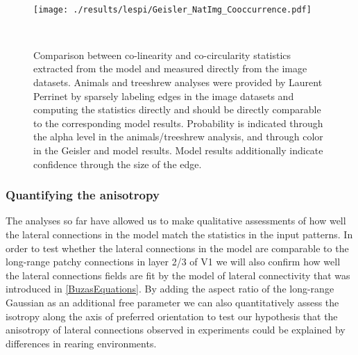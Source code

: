 \begin{figure}
  \begin{minipage}[t]{0.67\textwidth}
    \mbox{}\\[-\baselineskip]    \texttt{[image: ./results/lespi/Geisler\_NatImg\_Cooccurrence.pdf]}
  \end{minipage}\hfill
  \begin{minipage}[t]{0.3\textwidth}
    \mbox{}\\[-\baselineskip]
	\caption{Comparison between co-linearity and co-circularity
      statistics extracted from the model and measured directly from
      the image datasets. Animals and treeshrew analyses were provided
      by Laurent Perrinet by sparsely labeling edges in the image
      datasets and computing the statistics directly and should be
      directly comparable to the corresponding model
      results. Probability is indicated through the alpha level in the
      animals/treeshrew analysis, and through color in the Geisler and
      model results. Model results additionally indicate confidence
      through the size of the edge. }
	\label{NatImgGeisler}
    \end{minipage}
\end{figure}

\subsubsection{Quantifying the anisotropy}

The analyses so far have allowed us to make qualitative assessments of
how well the lateral connections in the model match the statistics in
the input patterns. In order to test whether the lateral connections
in the model are comparable to the long-range patchy connections in
layer 2/3 of V1 we will also confirm how well the lateral connections
fields are fit by the \cite{Buzas2006} model of lateral connectivity
that was introduced in \ref{BuzasEquations}. By adding the aspect
ratio of the long-range Gaussian as an additional free parameter we
can also quantitatively assess the isotropy along the axis of
preferred orientation to test our hypothesis that the anisotropy of
lateral connections observed in experiments \cite{Bosking1997} could
be explained by differences in rearing environments.

